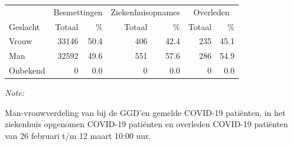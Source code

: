 \documentclass[
  english,
  man,floatsintext]{apa6}
\begin{document}
\begin{table}
\centering\begingroup\fontsize{11}{13}\selectfont

\begin{threeparttable}
\begin{tabular}{lrrrrrr}
\toprule
\multicolumn{1}{c}{ } & \multicolumn{2}{c}{Besmettingen} & \multicolumn{2}{c}{Ziekenhuisopnames} & \multicolumn{2}{c}{Overleden} \\
\cmidrule(l{3pt}r{3pt}){2-3} \cmidrule(l{3pt}r{3pt}){4-5} \cmidrule(l{3pt}r{3pt}){6-7}
Geslacht & Totaal & \% & Totaal & \% & Totaal & \%\\
\midrule
Vrouw & 33146 & 50.4 & 406 & 42.4 & 235 & 45.1\\
Man & 32592 & 49.6 & 551 & 57.6 & 286 & 54.9\\
Onbekend & 0 & 0.0 & 0 & 0.0 & 0 & 0.0\\
\bottomrule
\end{tabular}
\begin{tablenotes}
\item \textit{Note: } 
\item Man-vrouwverdeling van bij de GGD’en gemelde COVID-19 patiënten, in het ziekenhuis opgenomen COVID-19 patiënten en overleden COVID-19 patiënten van 26 februari t/m 12 maart 10:00 uur.
\end{tablenotes}
\end{threeparttable}
\endgroup{}
\end{table}
\newpage
\end{document}
